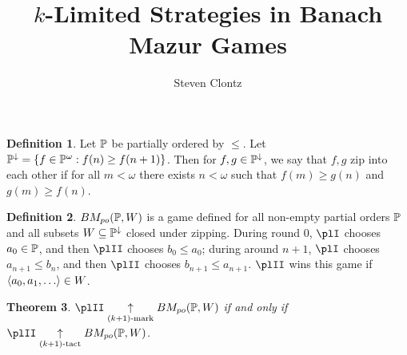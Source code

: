 \documentclass[11pt]{article}
\title{\(k\)-Limited Strategies in Banach Mazur Games}
\author{Steven Clontz}
\theoremstyle{plain}
\newtheorem{theorem}{Theorem}
\theoremstyle{definition}
\newtheorem{definition}[theorem]{Definition}
\theoremstyle{remark}
\theoremstyle{plain}
\theoremstyle{definition}
\theoremstyle{remark}
\newcommand{\bmPoGame}[2]{BM_{po}(#1,#2)}
\begin{document}
\maketitle

  \begin{definition}
    Let \(\mathbb{P}\) be partially ordered by \(\leq\).
    Let \(\mathbb{P}^{\downarrow}=\{f\in\mathbb{P}^\omega : f(n)\geq f(n+1)\}\).
    Then for \(f,g\in\mathbb{P}^\downarrow\), we say that \(f,g\) zip into each
    other if for all \(m<\omega\) there exists \(n<\omega\) such that
    \(f(m)\geq g(n)\) and \(g(m)\geq f(n)\).
  \end{definition}

  \begin{definition}
    \(\bmPoGame{\mb P}{W}\) is a game defined for all non-empty partial orders
    \(\mathbb{P}\) and all subsets \(W\subseteq\mathbb{P}^\downarrow\) closed under
    zipping. During round \(0\), \(\plI\) chooses \(a_0\in\mathbb{P}\),
    and then \(\plII\) chooses \(b_0\leq a_0\); during around \(n+1\),
    \(\plI\) chooses \(a_{n+1}\leq b_n\), and then \(\plII\) chooses
    \(b_{n+1}\leq a_{n+1}\). \(\plII\) wins this game if
    \(\<a_0,a_1,\dots\>\in W\).
  \end{definition}

  \begin{theorem}
    \(\plII\kmarkwin{(k+1)}\bmPoGame{\mb P}{W}\) if and only if
    \(\plII\ktactwin{(k+1)}\bmPoGame{\mb P}{W}\).
  \end{theorem}
\end{document}

